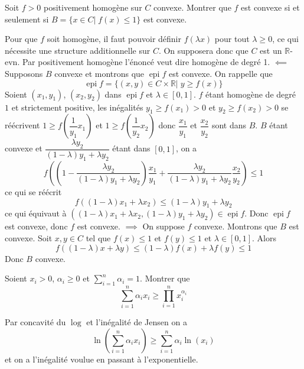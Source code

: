 \documentclass{fancybook}
\DeclareMathOperator{\epi}{epi}
\begin{document}
\begin{exercice}
Soit $f>0$ positivement homogène sur $C$ convexe. Montrer que $f$ est convexe si et seulement si $B=\{x\in C|\; f(x)\leq 1\}$ est convexe.
\end{exercice}
Pour que $f$ soit homogène, il faut pouvoir définir $f(\lambda x)$ pour tout $\lambda \geq 0$, ce qui nécessite une structure additionnelle sur $C$. On supposera donc que $C$ est un $\mathbb R$-evn. Par positivement homogène l'énoncé veut dire homogène de degré 1.\newline \newline
$\impliedby$ Supposons $B$ convexe et montrons que $\epi f$ est convexe. On rappelle que $$\epi f= \{(x,y)\in C\times \mathbb R|\;y\geq f(x)\}$$
Soient $(x_1,y_1)$, $(x_2,y_2)$ dans $\epi f$ et $\lambda \in [0,1]$. $f$ étant homogène de degré $1$ et strictement positive, les inégalités $y_1\geq f(x_1)>0$ et $y_2\geq f(x_2)>0$ se réécrivent $1\geq f(\dfrac{1}{y_1}x_1)$ et $1\geq f(\dfrac{1}{y_2}x_2)$ donc $\dfrac{x_1}{y_1}$ et $\dfrac{x_2}{y_2}$ sont dans $B$.\newline \newline 
$B$ étant convexe et $\dfrac{\lambda y_2}{(1-\lambda)y_1 + \lambda y_2}$ étant dans $[0,1]$, on a $$f\left(\left(1-\dfrac{\lambda y_2}{(1-\lambda)y_1 + \lambda y_2}\right)\dfrac{x_1}{y_1} + \dfrac{\lambda y_2}{(1-\lambda)y_1 + \lambda y_2}\dfrac{x_2}{y_2}\right)\leq 1$$
ce qui se réécrit $$f((1-\lambda)x_1 + \lambda x_2)\leq (1-\lambda)y_1 + \lambda y_2$$
ce qui équivaut à $((1-\lambda)x_1 + \lambda x_2,(1-\lambda)y_1 + \lambda y_2)\in \epi f$.\newline
Donc $\epi f$ est convexe, donc $f$ est convexe.\newline 
\newline 
$\implies$ On suppose $f$ convexe. Montrons que $B$ est convexe.\newline
Soit $x,y\in C$ tel que $f(x)\leq 1$ et $f(y)\leq 1$ et $\lambda \in [0,1]$. Alors $$f((1-\lambda)x+\lambda y)\leq (1-\lambda)f(x) + \lambda f(y)\leq 1$$
Donc $B$ convexe.

\begin{exercice}
\end{exercice}


\begin{exercice}
Soient $x_i>0$, $\alpha_i\geq 0$ et $\sum_{i=1}^n\alpha_i =1$. Montrer que $$\sum_{i=1}^n\alpha_i x_i \geq \prod_{i=1}
^nx_i^{\alpha_i}$$
\end{exercice}
Par concavité du $\log$ et l'inégalité de Jensen on a $$\ln\left( \sum_{i=1}^n\alpha_i x_i \right)\geq \sum_{i=1}^n \alpha_i \ln(x_i)$$
et on a l'inégalité voulue en passant à l'exponentielle.
\end{document}
